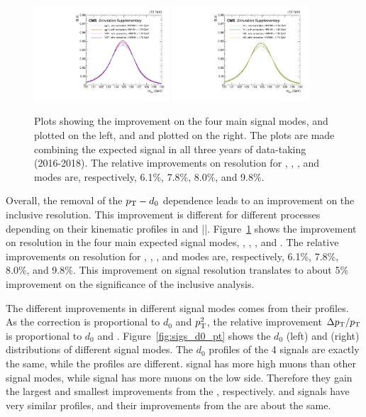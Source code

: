\begin{figure}[!htb]
      \centering
      \captionsetup{justification=justified}
      \includegraphics[width=0.45\textwidth]{pics/muon_corr/GeoFit/performance/ggHVBF.pdf}
      \includegraphics[width=0.45\textwidth]{pics/muon_corr/GeoFit/performance/VHttH.pdf}
      \caption{Plots showing the \GeoFit improvement on the four main \hmm signal modes, 
               \ggH and \qqH plotted on the left, and \VH and \ttH plotted on the right.
               The plots are made combining the expected signal in all three years of data-taking (2016-2018).
               The relative improvements on \mmm resolution for \ggH, \qqH, \VH, and \ttH modes are, respectively,
               6.1\%, 7.8\%, 8.0\%, and 9.8\%.
               }
      \label{fig:geofit_sigs}
\end{figure}

Overall, the removal of the $p_{\mathrm{T}}-d_0$ dependence leads to an improvement on the inclusive \mmm resolution.
This improvement is different for different processes depending on their kinematic profiles in \pt and |\eta|.
Figure~\ref{fig:geofit_sigs} shows the improvement on \mmm resolution in the four main expected signal modes, \ggH, \qqH, \VH, and \ttH.
The relative improvements on \mmm resolution for \ggH, \qqH, \VH, and \ttH modes are, 
respectively, 6.1\%, 7.8\%, 8.0\%, and 9.8\%.
This improvement on signal resolution translates to about 5\% improvement on the significance of the inclusive \hmm analysis.

The different improvements in different signal modes comes from their \pt profiles.
As the correction is proportional to $d_0$ and $p_{\mathrm{T}}^{2}$, 
the relative improvement $\Delta p_{\mathrm{T}} / p_{\mathrm{T}}$ is proportional to $d_0$ and \pt. 
Figure~\ref{fig:sigs_d0_pt} shows the $d_0$ (left) and \pt (right) distributions of different signal modes.
The $d_0$ profiles of the 4 signals are exactly the same,
while the \pt profiles are different.
\ttH signal has more high \pt muons than other signal modes,
while \ggH signal has more muons on the low \pt side.
Therefore they gain the largest and smallest improvements from the \GeoFit, respectively.
\qqH and \VH signals have very similar \pt profiles, 
and their improvements from the \GeoFit are about the same.

